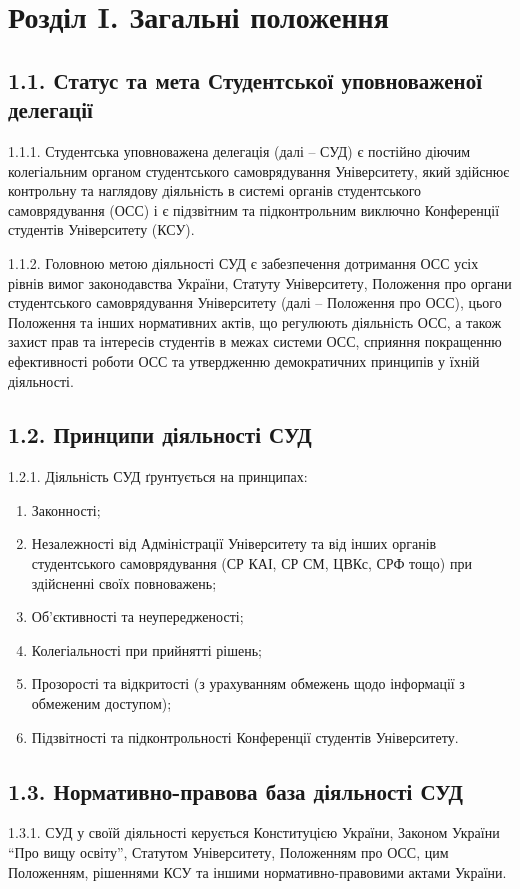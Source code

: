 \section*{Розділ I. Загальні положення}

\subsection*{1.1. Статус та мета Студентської уповноваженої делегації}
    1.1.1. Студентська уповноважена делегація (далі – СУД) є постійно діючим колегіальним органом студентського самоврядування Університету, який здійснює контрольну та наглядову діяльність в системі органів студентського самоврядування (ОСС) і є підзвітним та підконтрольним виключно Конференції студентів Університету (КСУ).

    1.1.2. Головною метою діяльності СУД є забезпечення дотримання ОСС усіх рівнів вимог законодавства України, Статуту Університету, Положення про органи студентського самоврядування Університету (далі – Положення про ОСС), цього Положення та інших нормативних актів, що регулюють діяльність ОСС, а також захист прав та інтересів студентів в межах системи ОСС, сприяння покращенню ефективності роботи ОСС та утвердженню демократичних принципів у їхній діяльності.

\subsection*{1.2. Принципи діяльності СУД}
    1.2.1. Діяльність СУД ґрунтується на принципах:
        \begin{enumerate}[label=\alph*)]
            \item Законності;
            \item Незалежності від Адміністрації Університету та від інших органів студентського самоврядування (СР КАІ, СР СМ, ЦВКс, СРФ тощо) при здійсненні своїх повноважень;
            \item Об'єктивності та неупередженості;
            \item Колегіальності при прийнятті рішень;
            \item Прозорості та відкритості (з урахуванням обмежень щодо інформації з обмеженим доступом);
            \item Підзвітності та підконтрольності Конференції студентів Університету.
        \end{enumerate}

\subsection*{1.3. Нормативно-правова база діяльності СУД}
    1.3.1. СУД у своїй діяльності керується Конституцією України, Законом України ``Про вищу освіту'', Статутом Університету, Положенням про ОСС, цим Положенням, рішеннями КСУ та іншими нормативно-правовими актами України.

